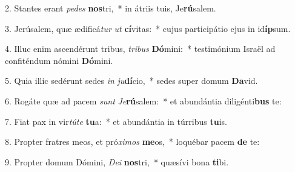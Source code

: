 2. Stantes erant \textit{pe}\textit{des} \textbf{nos}tri,~*  in átriis tuis, Je\textbf{rú}salem.\

3. Jerúsalem, quæ ædificá\textit{tur} \textit{ut} \textbf{cí}vitas:~*  cujus participátio ejus in id\textbf{íp}sum.\

4. Illuc enim ascendérunt tribus, \textit{tri}\textit{bus} \textbf{Dó}mini:~*  testimónium Israël ad confiténdum nómini \textbf{Dó}mini.\

5. Quia illic sedérunt sedes \textit{in} \textit{ju}\textbf{dí}cio,~*  sedes super domum \textbf{Da}vid.\

6. Rogáte quæ ad pacem \textit{sunt} \textit{Je}\textbf{rú}salem:~*  et abundántia diligénti\textbf{bus} te:\

7. Fiat pax in vir\textit{tú}\textit{te} \textbf{tu}a:~*  et abundántia in túrribus \textbf{tu}is.\

8. Propter fratres meos, et pró\textit{xi}\textit{mos} \textbf{me}os,~*  loquébar pacem \textbf{de} te:\

9. Propter domum Dómini, \textit{De}\textit{i} \textbf{nos}tri,~*  quæsívi bona \textbf{ti}bi.\

